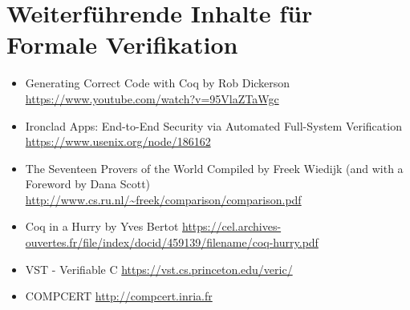 \section{Weiterführende Inhalte für Formale Verifikation}
\label{a:somelabel}

\begin{itemize}
	\item Generating Correct Code with Coq by Rob Dickerson \url{https://www.youtube.com/watch?v=95VlaZTaWgc}
	\item Ironclad Apps: End-to-End Security via Automated Full-System Verification \url{https://www.usenix.org/node/186162}
	\item The Seventeen Provers of the World Compiled by Freek Wiedijk
	(and with a Foreword by Dana Scott)
	\url{http://www.cs.ru.nl/~freek/comparison/comparison.pdf}
	\item Coq in a Hurry by Yves Bertot \url{https://cel.archives-ouvertes.fr/file/index/docid/459139/filename/coq-hurry.pdf}
	\item VST - Verifiable C \url{https://vst.cs.princeton.edu/veric/}
	\item COMPCERT \url{http://compcert.inria.fr}
\end{itemize} 

